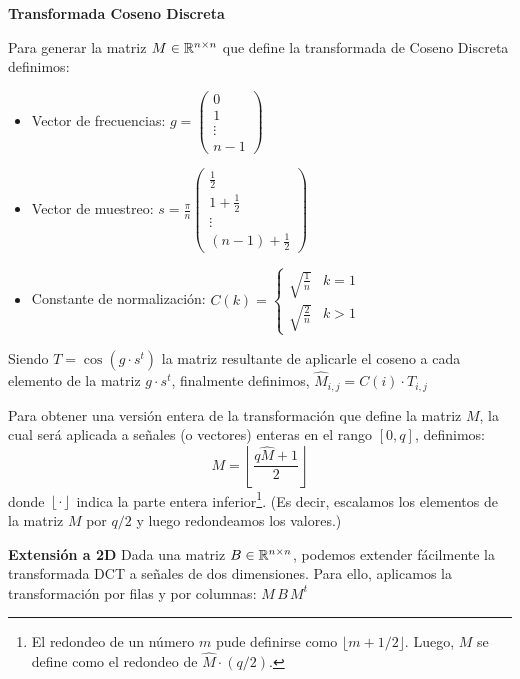 {\bf Transformada Coseno Discreta} 

Para generar la matriz $M\in\mathbb{R}^{n\times n}$ que define la transformada de Coseno Discreta definimos: 
\begin{itemize}
 \item Vector de frecuencias:  $g = \left(\begin{array}{c} 0 \\ 1 \\ \vdots \\ n-1 \end{array} \right)$
 \item Vector de muestreo: $ s= {\displaystyle \frac{\pi}{n} }\left(\begin{array}{c} \frac{1}{2} \\1+\frac{1}{2} \\  \vdots \\ (n-1)+\frac{1}{2} \end{array} \right) $
 \item Constante de normalizaci\'on: $C(k) = \left\{ \begin{array}{lr}\sqrt{\frac{1}{n}} & k=1 \\ \sqrt{\frac{2}{n}} & k > 1 \end{array} \right.$
\end{itemize}

Siendo $T=\cos(g\cdot s^t)$ la matriz resultante de aplicarle el coseno a cada elemento de la matriz $g\cdot s^t$,
finalmente definimos, $\widehat{M}_{i,j} = C(i) \cdot T_{i,j}$

Para obtener una versi\'on entera de la transformaci\'on que define la matriz $M$, la cual ser\'a aplicada a se\~nales (o vectores) enteras en el rango $[0,q]$, definimos:
\begin{equation}
M = \left\lfloor \frac{q \widehat{M} + 1}{2}  \right\rfloor \label{eq:dctint}
\end{equation} 
donde $\left\lfloor\cdot\right\rfloor$ indica la parte entera inferior\footnote{El redondeo de un n\'umero $m$ pude definirse como $\lfloor m + 1/2 \rfloor$. Luego, $M$ se define como el redondeo de $\widehat{M}\cdot(q/2)$.}. (Es decir, escalamos los elementos de la matriz $M$ por $q/2$ y luego redondeamos los valores.)

{\bf Extensi\'on a 2D}
Dada una matriz $B\in\mathbb{R}^{n\times n}$, podemos extender f\'acilmente la transformada DCT a se\~nales de dos dimensiones. Para ello, aplicamos la transformaci\'on por filas y por columnas: $ M\, B\, M^t $

